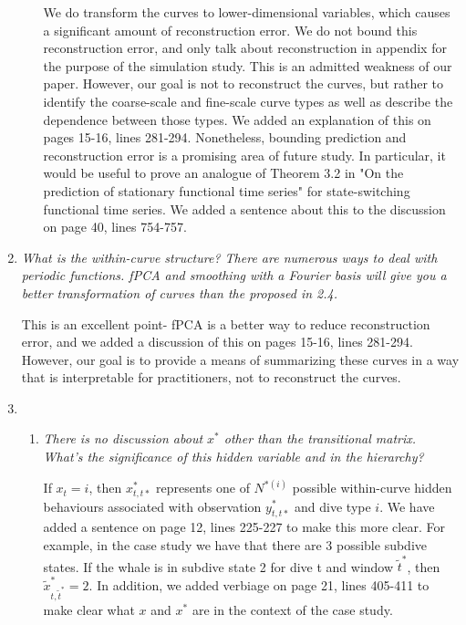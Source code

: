 \documentclass{article}
\begin{document}
\begin{enumerate}
\begin{enumerate}
        We do transform the curves to lower-dimensional variables, which causes a significant amount of reconstruction error. We do not bound this reconstruction error, and only talk about reconstruction in appendix for the purpose of the simulation study. This is an admitted weakness of our paper. However, our goal is not to reconstruct the curves, but rather to identify the coarse-scale and fine-scale curve types as well as describe the dependence between those types. We added an explanation of this on pages 15-16, lines 281-294. Nonetheless, bounding prediction and reconstruction error is a promising area of future study. In particular, it would be useful to prove an analogue of Theorem 3.2 in "On the prediction of stationary functional time series" for state-switching functional time series. We added a sentence about this to the discussion on page 40, lines 754-757.
        
    \end{enumerate}
    
    \item \textit{What is the within-curve structure? There are numerous ways to deal with periodic functions. fPCA and smoothing with a Fourier basis will give you a better transformation of curves than the proposed in 2.4.} 
    
    This is an excellent point- fPCA is a better way to reduce reconstruction error, and we added a discussion of this on pages 15-16, lines 281-294. However, our goal is to provide a means of summarizing these curves in a way that is interpretable for practitioners, not to reconstruct the curves.
    
    \item \begin{enumerate}
        \item \textit{There is no discussion about $x^*$ other than the transitional matrix. What's the significance of this hidden variable and in the hierarchy?} 
        
        If $x_t = i$, then $x_{t,t*}^*$ represents one of $N^{*(i)}$ possible within-curve hidden behaviours associated with observation $y_{t,t*}^*$ and dive type $i$. We have added a sentence on page 12, lines 225-227 to make this more clear. For example, in the case study we have that there are 3 possible subdive states. If the whale is in subdive state 2 for dive t and window $\tilde t^*$, then $\tilde x^*_{t,\tilde t^*} = 2$.  In addition, we added verbiage on page 21, lines 405-411 to make clear what $x$ and $x^*$ are in the context of the case study. 
        

\end{enumerate}
\end{enumerate}
\end{document}
